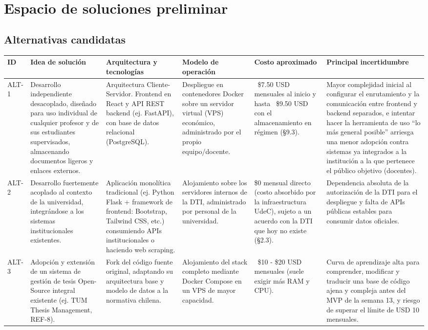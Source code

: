 \documentclass[10pt,a4paper]{article}
\newcommand{\hrow}{\rowcolor{encabezado}}
\newcommand{\h}[1]{\textbf{#1}}
\begin{document}
\section{Espacio de soluciones preliminar}
\subsection{Alternativas candidatas}
\begin{xltabular}{\linewidth}{|P{1.4cm}|L|P{2.8cm}|P{2.6cm}|P{2.2cm}|P{2.4cm}|}
\hline\hrow \h{ID} & \h{Idea de solución} & \h{Arquitectura y tecnologías} & \h{Modelo de operación} & \h{Costo aproximado} & \h{Principal incertidumbre} \\ \hline
\endhead
ALT-1 & Desarrollo independiente desacoplado, diseñado para uso individual de cualquier profesor y de sus estudiantes supervisados, almacenando documentos ligeros y enlaces externos. & Arquitectura Cliente-Servidor. Frontend en React y API REST backend (ej. FastAPI), con base de datos relacional (PostgreSQL). & Despliegue en contenedores Docker sobre un servidor virtual (VPS) económico, administrado por el propio equipo/docente. & ~\$7.50 USD mensuales al inicio y hasta ~\$9.50 USD con el almacenamiento en régimen (§9.3). & Mayor complejidad inicial al configurar el enrutamiento y la comunicación entre frontend y backend separados, e intentar hacer la herramienta de uso ``lo más general posible'' arriesga una menor adopción contra sistemas ya integrados a la institución a la que pertenece el público objetivo (docentes). \\ \hline
ALT-2 & Desarrollo fuertemente acoplado al contexto de la universidad, integrándose a los sistemas institucionales existentes. & Aplicación monolítica tradicional (ej. Python Flask + framework de frontend: Bootstrap, Tailwind CSS, etc.) consumiendo APIs institucionales o haciendo web scraping. & Alojamiento sobre los servidores internos de la DTI, administrado por personal de la universidad. & \$0 mensual directo (costo absorbido por la infraestructura UdeC), sujeto a un acuerdo con la DTI que hoy no existe (§2.3). & Dependencia absoluta de la autorización de la DTI para el despliegue y falta de APIs públicas estables para consumir datos oficiales. \\ \hline
ALT-3 & Adopción y extensión de un sistema de gestión de tesis Open-Source integral existente (ej. TUM Thesis Management, REF-8). & Fork del código fuente original, adaptando su arquitectura base y modelo de datos a la normativa chilena. & Alojamiento del stack completo mediante Docker Compose en un VPS de mayor capacidad. & ~\$10 - \$20 USD mensuales (suele exigir más RAM y CPU). & Curva de aprendizaje alta para comprender, modificar y traducir una base de código ajena y compleja antes del MVP de la semana 13, y riesgo de superar el límite de USD 10 mensuales. \\ \hline
\end{xltabular}
\end{document}

